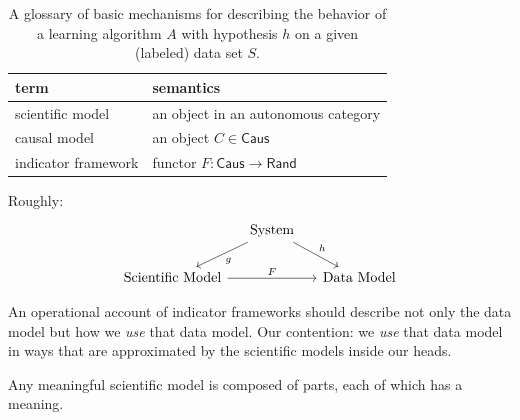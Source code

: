\documentclass{article}
\theoremstyle{definition}
\newcommand{\Cat}[1]{\mathsf{#1}}
\def\Rand{\Cat{Rand}}
\def\Caus{\Cat{Caus}}
\begin{document}
\begin{table}[tbh]
\label{table:ML_glossary}
\begin{center}
\begin{tabular}{l | p{10cm}}
term & semantics \\ \hline
scientific model & an object in an autonomous category \\
causal model & an object $C \in \Caus$ \\
indicator framework & functor $F : \Caus \to \Rand$ \\
\end{tabular}
\end{center}
\caption{A glossary of basic mechanisms for describing the behavior of a learning algorithm $A$ with hypothesis $h$ on a given (labeled) data set $S$.}
\end{table}


Roughly:
\[
\begin{tikzcd}[column sep=small]
& \text{System} \arrow{dr}{h} \arrow{dl}{g} & \\
\text{Scientific Model} \arrow{rr}{F} & & \text{Data Model} 
\end{tikzcd}
\]

An operational account of indicator frameworks should describe not only the data model but how we \emph{use} that data model. Our contention: we \emph{use} that data model in ways that are approximated by the scientific models inside our heads. 

Any meaningful scientific model is composed of parts, each of which has a meaning.
\end{document}
